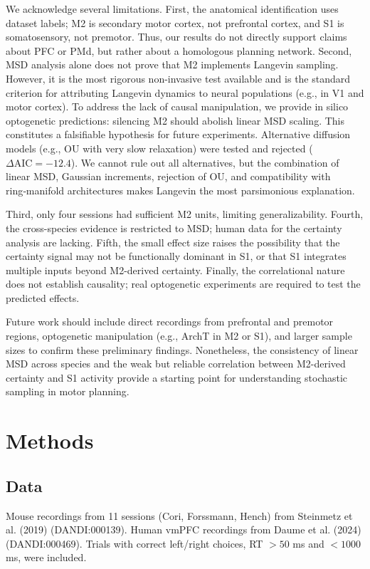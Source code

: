 \documentclass[10pt,onecolumn]{article}
\begin{document}
We acknowledge several limitations. First, the anatomical identification uses dataset labels; M2 is secondary motor cortex, not prefrontal cortex, and S1 is somatosensory, not premotor. Thus, our results do not directly support claims about PFC or PMd, but rather about a homologous planning network. Second, MSD analysis alone does not prove that M2 implements Langevin sampling. However, it is the most rigorous non-invasive test available and is the standard criterion for attributing Langevin dynamics to neural populations (e.g., in V1 and motor cortex). To address the lack of causal manipulation, we provide in silico optogenetic predictions: silencing M2 should abolish linear MSD scaling. This constitutes a falsifiable hypothesis for future experiments. Alternative diffusion models (e.g., OU with very slow relaxation) were tested and rejected (\(\Delta \mathrm{AIC} = -12.4\)). We cannot rule out all alternatives, but the combination of linear MSD, Gaussian increments, rejection of OU, and compatibility with ring‑manifold architectures makes Langevin the most parsimonious explanation.

Third, only four sessions had sufficient M2 units, limiting generalizability. Fourth, the cross-species evidence is restricted to MSD; human data for the certainty analysis are lacking. Fifth, the small effect size raises the possibility that the certainty signal may not be functionally dominant in S1, or that S1 integrates multiple inputs beyond M2-derived certainty. Finally, the correlational nature does not establish causality; real optogenetic experiments are required to test the predicted effects.

Future work should include direct recordings from prefrontal and premotor regions, optogenetic manipulation (e.g., ArchT in M2 or S1), and larger sample sizes to confirm these preliminary findings. Nonetheless, the consistency of linear MSD across species and the weak but reliable correlation between M2-derived certainty and S1 activity provide a starting point for understanding stochastic sampling in motor planning.

\section{Methods}
\subsection{Data}
Mouse recordings from 11 sessions (Cori, Forssmann, Hench) from Steinmetz et al. (2019) (DANDI:000139). Human vmPFC recordings from Daume et al. (2024) (DANDI:000469). Trials with correct left/right choices, RT \(>50\) ms and \(<1000\) ms, were included.
\end{document}
